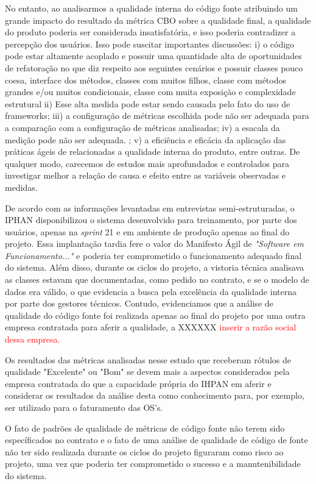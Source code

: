 No entanto, ao analisarmos a qualidade interna do código fonte atribuindo um grande impacto do resultado da métrica CBO sobre a qualidade final, a qualidade do produto poderia ser considerada insatisfatória, e isso poderia contradizer a percepção dos usuários. Isso pode suscitar importantes discussões: i) o código pode estar altamente acoplado e possuir uma quantidade alta de oportunidades de refatoração no que diz respeito aos seguintes cenários e possuir classes pouco coesa, interface dos métodos, classes com muitos filhos, classe com métodos grandes e/ou muitos condicionais, classe com muita exposição e complexidade estrutural ii) Esse alta medida pode estar sendo causada pelo fato do uso de frameworks; iii) a configuração de métricas escolhida pode não ser adequada para a comparação com a configuração de métricas analisadas; iv) a esacala da medição pode não ser adequada. ; v) a eficiência e eficácia da aplicação das práticas ágeis de relacionadas a qualidade interna do produto, entre outras. De qualquer modo, carecemos de estudos mais aprofundados e controlados para investigar melhor a relação de causa e efeito entre as variáveis observadas e medidas.

De acordo com as informações levantadas em entrevistas semi-estruturadas, o IPHAN disponibilizou o sistema desenvolvido para treinamento, por parte dos usuários, apenas na \textit{sprint} 21 e em ambiente de produção apenas ao final do projeto. Essa implantação tardia fere o valor do Manifesto Ágil de \textit{"Software em Funcionamento..."} e poderia ter comprometido o funcionamento adequado final do sistema. Além disso, durante os ciclos do projeto, a vistoria técnica analisava as classes estavam que documentadas, como pedido no contrato, e se o modelo de dados era válido, o que evidencia a busca pela excelência da qualidade interna por parte dos gestores técnicos. Contudo, evidenciamos que a análise de qualidade do código fonte foi realizada apenas ao final do projeto por uma outra empresa contratada para aferir a qualidade, a XXXXXX \textcolor{red}{inserir a razão social dessa empresa.} 


Os resultados das métricas analisadas nesse estudo que receberam rótulos de qualidade "Excelente" ou "Bom" se devem mais a aspectos considerados pela empresa contratada do que a capacidade própria do IHPAN em aferir e considerar os resultados da análise desta como conhecimento para, por exemplo, ser utilizado para o faturamento das OS's.

O fato de padrões de qualidade de métricas de código fonte não terem sido específicados no contrato e o fato de uma análise de qualidade de código de fonte não ter sido realizada durante os ciclos do projeto figuraram como risco ao projeto, uma vez que poderia ter comprometido o sucesso e a manutenibilidade do sistema.